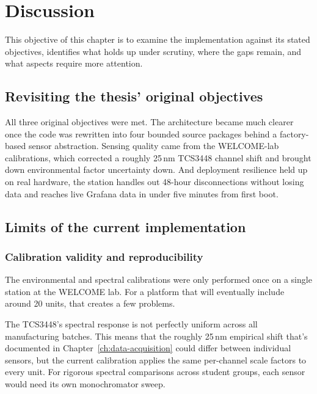 ﻿\chapter{Discussion}
\label{ch:discussion}

\begingroup
\setlength{\parskip}{0.6em}

This objective of this chapter is to examine the implementation against its stated objectives, identifies what holds up under scrutiny, where the gaps remain, and what aspects require more attention.

\section{Revisiting the thesis' original objectives}

All three original objectives were met. The architecture became much clearer once the code was rewritten into four bounded source packages behind a factory-based sensor abstraction. Sensing quality came from the WELCOME-lab calibrations, which corrected a roughly 25\,nm TCS3448 channel shift and brought down environmental factor uncertainty down. And deployment resilience held up on real hardware, the station handles out 48-hour disconnections without losing data and reaches live Grafana data in under five minutes from first boot.

\section{Limits of the current implementation}

\subsection{Calibration validity and reproducibility}

The environmental and spectral calibrations were only performed once on a single station at the WELCOME lab. For a platform that will eventually include around 20 units, that creates a few problems.

The TCS3448's spectral response is not perfectly uniform across all manufacturing batches. This means that the roughly 25\,nm empirical shift that's documented in Chapter~\ref{ch:data-acquisition} could differ between individual sensors, but the current calibration applies the same per-channel scale factors to every unit. For rigorous spectral comparisons across student groups, each sensor would need its own monochromator sweep.

